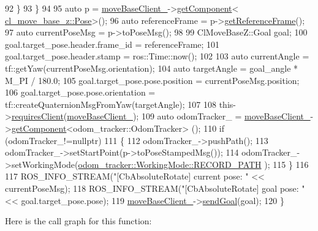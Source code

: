 \begin{DoxyCode}
92         \}
93     \}
94 
95     \textcolor{keyword}{auto} p = \hyperlink{classcl__move__base__z_1_1CbAbsoluteRotate_a8ddbef73316ff96f30493b28b5627e35}{moveBaseClient\_}->\hyperlink{classsmacc_1_1ISmaccClient_adef78db601749ca63c19e74a27cb88cc}{getComponent}<
      \hyperlink{classcl__move__base__z_1_1Pose}{cl\_move\_base\_z::Pose}>();
96     \textcolor{keyword}{auto} referenceFrame = p->\hyperlink{classcl__move__base__z_1_1Pose_af8c2dc151e74aa8da6b283d1c8563051}{getReferenceFrame}();
97     \textcolor{keyword}{auto} currentPoseMsg = p->toPoseMsg();
98 
99     ClMoveBaseZ::Goal goal;
100     goal.target\_pose.header.frame\_id = referenceFrame;
101     goal.target\_pose.header.stamp = ros::Time::now();
102 
103     \textcolor{keyword}{auto} currentAngle = tf::getYaw(currentPoseMsg.orientation);
104     \textcolor{keyword}{auto} targetAngle = goal\_angle * M\_PI / 180.0;
105     goal.target\_pose.pose.position = currentPoseMsg.position;
106     goal.target\_pose.pose.orientation = tf::createQuaternionMsgFromYaw(targetAngle);
107 
108     this->\hyperlink{classsmacc_1_1ISmaccClientBehavior_a32b16e99e3b4cb289414203dc861a440}{requiresClient}(\hyperlink{classcl__move__base__z_1_1CbAbsoluteRotate_a8ddbef73316ff96f30493b28b5627e35}{moveBaseClient\_});
109     \textcolor{keyword}{auto} odomTracker\_ = \hyperlink{classcl__move__base__z_1_1CbAbsoluteRotate_a8ddbef73316ff96f30493b28b5627e35}{moveBaseClient\_}->\hyperlink{classsmacc_1_1ISmaccClient_adef78db601749ca63c19e74a27cb88cc}{getComponent}<odom\_tracker::OdomTracker>
      ();
110     \textcolor{keywordflow}{if} (odomTracker\_!=\textcolor{keyword}{nullptr})
111     \{
112         odomTracker\_->pushPath();
113         odomTracker\_->setStartPoint(p->toPoseStampedMsg());
114         odomTracker\_->setWorkingMode(\hyperlink{namespacecl__move__base__z_1_1odom__tracker_ac46b05813b2791604f6cd0a39ace3ef8a023bc3adf68871ef7a0c616765ac80a7}{odom\_tracker::WorkingMode::RECORD\_PATH}
      );
115     \}
116 
117     ROS\_INFO\_STREAM(\textcolor{stringliteral}{"[CbAbsoluteRotate] current pose: "} << currentPoseMsg);
118     ROS\_INFO\_STREAM(\textcolor{stringliteral}{"[CbAbsoluteRotate] goal pose: "} << goal.target\_pose.pose);
119     \hyperlink{classcl__move__base__z_1_1CbAbsoluteRotate_a8ddbef73316ff96f30493b28b5627e35}{moveBaseClient\_}->\hyperlink{classsmacc_1_1client__bases_1_1SmaccActionClientBase_a9c47a5094ac8afb01680307fe5eca922}{sendGoal}(goal);
120 \}
\end{DoxyCode}
Here is the call graph for this function\+:
\nopagebreak
